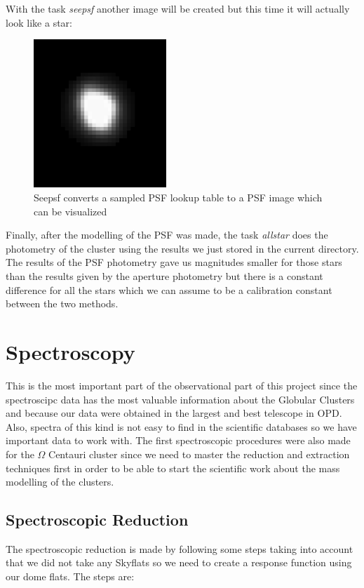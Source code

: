 With the task \textit{seepsf} another image will be created but this time it will actually look like a star:

\begin{figure}[H]
\centering
\includegraphics[width=5cm]{images/psf3.png}
\caption{Seepsf converts a sampled PSF lookup table to a PSF image which can be visualized}
\end{figure}

Finally, after the modelling of the PSF was made, the task \textit{allstar} does the photometry of the cluster using the results we just stored in the current directory. The results of the PSF photometry gave us magnitudes smaller for those stars than the results given by the aperture photometry but there is a constant difference for all the stars which we can assume to be a calibration constant between the two methods. 

\section{Spectroscopy}

This is the most important part of the observational part of this project since the spectroscipc data has the most valuable information about the Globular Clusters and because our data were obtained in the largest and best telescope in OPD. Also, spectra of this kind is not easy to find in the scientific databases so we have important data to work with. The first spectroscopic procedures were also made for the $ \Omega $ Centauri cluster since we need to master the reduction and extraction techniques first in order to be able to start the scientific work about the mass modelling of the clusters.

\subsection{Spectroscopic Reduction}

The spectroscopic reduction is made by following some steps taking into account that we did not take any Skyflats so we need to create a response function using our dome flats. The steps are:

